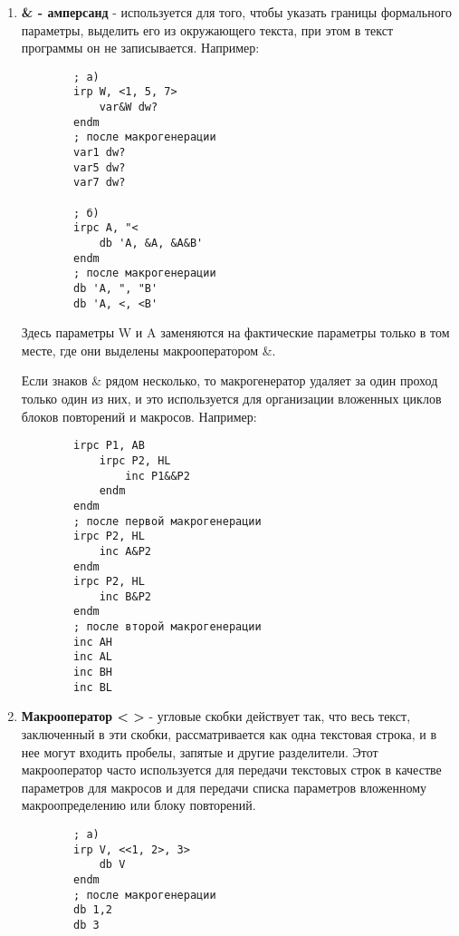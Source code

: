 \begin{enumerate}
    \item \textbf{\& - амперсанд} - используется для того, чтобы указать границы формального параметры, выделить его из окружающего текста, при этом в текст программы он не записывается. Например:
    \begin{verbatim}
        ; a)
        irp W, <1, 5, 7>
            var&W dw?
        endm
        ; после макрогенерации
        var1 dw?
        var5 dw?
        var7 dw?

        ; б)
        irpc A, "<
            db 'A, &A, &A&B'
        endm
        ; после макрогенерации
        db 'A, ", "B'
        db 'A, <, <B'
    \end{verbatim}
    Здесь параметры W и A заменяются на фактические параметры только в том месте, где они выделены макрооператором \&.

    Если знаков \& рядом несколько, то макрогенератор удаляет за один проход только один из них, и это используется для организации вложенных циклов блоков повторений и макросов. Например:
    \begin{verbatim}
        irpc P1, AB
            irpc P2, HL
                inc P1&&P2
            endm
        endm
        ; после первой макрогенерации
        irpc P2, HL
            inc A&P2
        endm
        irpc P2, HL
            inc B&P2
        endm
        ; после второй макрогенерации
        inc AH
        inc AL
        inc BH
        inc BL
    \end{verbatim}
    \item \textbf{Макрооператор < >} - угловые скобки действует так, что весь текст, заключенный в эти скобки, рассматривается как одна текстовая строка, и в нее могут входить пробелы, запятые и другие разделители.
    Этот макрооператор часто используется для передачи текстовых строк в качестве параметров для макросов и для передачи списка параметров вложенному макроопределению или блоку повторений.
    \begin{verbatim}
        ; a)
        irp V, <<1, 2>, 3>
            db V
        endm
        ; после макрогенерации 
        db 1,2
        db 3


\end{verbatim}
\end{enumerate}
